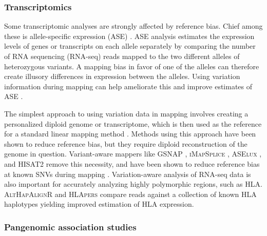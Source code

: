 \subsubsection{Transcriptomics}

Some transcriptomic analyses are strongly affected by reference bias.
Chief among these is allele-specific expression (ASE) \cite{Degner2009-vw,stevenson2013sources,Castel2015-ef}.
ASE analysis estimates the expression levels of genes or transcripts on each allele separately by comparing the number of RNA sequencing (RNA-seq) reads mapped to the two different alleles of heterozygous variants.
A mapping bias in favor of one of the alleles can therefore create illusory differences in expression between the alleles.
Using variation information during mapping can help ameliorate this and improve estimates of ASE \cite{Castel2015-ef,Miao2018-ps}.

The simplest approach to using variation data in mapping involves creating a personalized diploid genome or transcriptome, which is then used as the reference for a standard linear mapping method \cite{Raghupathy2018-sd}.
Methods using this approach have been shown to reduce reference bias, but they require diploid reconstruction of the genome in question.
Variant-aware mappers like \textsc{GSNAP} \cite{Wu2010-hv}, \textsc{iMapSplice} \cite{Liu_2018}, \textsc{ASElux} \cite{Miao2018-ps}, and \textsc{HISAT2} \cite{Kim_2019} remove this necessity, and have been shown to reduce reference bias at known SNVs during mapping \cite{Castel2015-ef,Liu_2018}.
Variation-aware analysis of RNA-seq data is also important for accurately analyzing highly polymorphic regions, such as HLA.
\textsc{AltHapAlignR} \cite{Lee_2018} and \textsc{HLApers} \cite{Aguiar2019-fy} compare reads against a collection of known HLA haplotypes yielding improved estimation of HLA expression.

\subsubsection{Pangenomic association studies}

